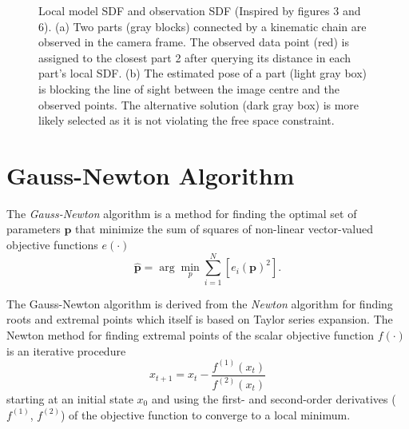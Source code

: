 \begin{figure}
\centering
{}
\caption[Signed Distance Function]{Local model SDF and observation SDF (Inspired by \cite{Schmidt2015} figures 3 and 6). (a) Two parts (gray blocks) connected by a kinematic chain are observed in the camera frame. The observed data point (red) is assigned to the closest part 2 after querying its distance in each part's local SDF. (b) The estimated pose of a part (light gray box) is blocking the line of sight between the image centre and the observed points. The alternative solution (dark gray box) is more likely selected as it is not violating the free space constraint.}
\end{figure}

\section{Gauss-Newton Algorithm}

The \textit{Gauss-Newton} algorithm is a method for finding the optimal set of parameters $\mathbf{p}$ that minimize the sum of squares of non-linear vector-valued objective functions $e(\cdot)$
%
\begin{equation}
\hat{\mathbf{p}} = \arg\min_{p} \sum_{i=1}^N\left[ e_i(\mathbf{p})^2\right] .
\end{equation}

The Gauss-Newton algorithm is derived from the \textit{Newton} algorithm for finding roots and extremal points which itself is based on Taylor series expansion. The Newton method for finding extremal points of the scalar objective function $f(\cdot)$ is an iterative procedure
%
\begin{equation}
x_{t+1} = x_t - \frac{f^{(1)}(x_t)}{f^{(2)}(x_t)}
\label{eqn:newton_minimum}
\end{equation}
%
starting at an initial state $x_0$ and using the first- and second-order derivatives ($f^{(1)}$, $f^{(2)}$) of the objective function to converge to a local minimum.

